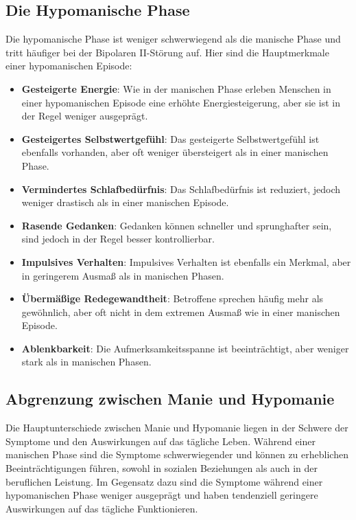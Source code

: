 \subsection{Die Hypomanische Phase}

Die hypomanische Phase ist weniger schwerwiegend als die manische Phase und tritt häufiger bei der Bipolaren II-Störung auf. Hier sind die Hauptmerkmale einer hypomanischen Episode:

\begin{itemize}
  \item \textbf{Gesteigerte Energie}: Wie in der manischen Phase erleben Menschen in einer hypomanischen Episode eine erhöhte Energiesteigerung, aber sie ist in der Regel weniger ausgeprägt.
  
  \item \textbf{Gesteigertes Selbstwertgefühl}: Das gesteigerte Selbstwertgefühl ist ebenfalls vorhanden, aber oft weniger übersteigert als in einer manischen Phase.
  
  \item \textbf{Vermindertes Schlafbedürfnis}: Das Schlafbedürfnis ist reduziert, jedoch weniger drastisch als in einer manischen Episode.
  
  \item \textbf{Rasende Gedanken}: Gedanken können schneller und sprunghafter sein, sind jedoch in der Regel besser kontrollierbar.
  
  \item \textbf{Impulsives Verhalten}: Impulsives Verhalten ist ebenfalls ein Merkmal, aber in geringerem Ausmaß als in manischen Phasen.
  
  \item \textbf{Übermäßige Redegewandtheit}: Betroffene sprechen häufig mehr als gewöhnlich, aber oft nicht in dem extremen Ausmaß wie in einer manischen Episode.
  
  \item \textbf{Ablenkbarkeit}: Die Aufmerksamkeitsspanne ist beeinträchtigt, aber weniger stark als in manischen Phasen.
\end{itemize}

\subsection{Abgrenzung zwischen Manie und Hypomanie}

Die Hauptunterschiede zwischen Manie und Hypomanie liegen in der Schwere der Symptome und den Auswirkungen auf das tägliche Leben. Während einer manischen Phase sind die Symptome schwerwiegender und können zu erheblichen Beeinträchtigungen führen, sowohl in sozialen Beziehungen als auch in der beruflichen Leistung. Im Gegensatz dazu sind die Symptome während einer hypomanischen Phase weniger ausgeprägt und haben tendenziell geringere Auswirkungen auf das tägliche Funktionieren.

